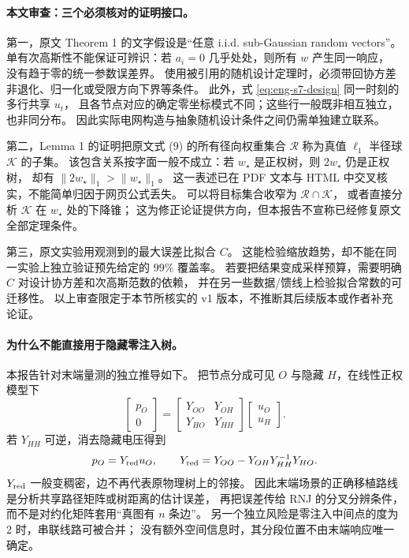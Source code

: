 \paragraph{本文审查：三个必须核对的证明接口。}
第一，原文 Theorem 1 的文字假设是“任意 i.i.d. sub-Gaussian random vectors”。
单有次高斯性不能保证可辨识：若 $a_i=0$ 几乎处处，则所有 $w$ 产生同一响应，
没有趋于零的统一参数误差界。
使用被引用的随机设计定理时，必须带回协方差非退化、归一化或受限方向下界等条件。
此外，式 \eqref{eq:eng-s7-design} 同一时刻的多行共享 $u_t$，
且各节点对应的确定零坐标模式不同；这些行一般既非相互独立，也非同分布。
因此实际电网构造与抽象随机设计条件之间仍需单独建立联系。

第二，Lemma 1 的证明把原文式 (9) 的所有径向权重集合 $\mathcal R$
称为真值 $\ell_1$ 半径球 $\mathcal K$ 的子集。
该包含关系按字面一般不成立：若 $w_\star$ 是正权树，则 $2w_\star$ 仍是正权树，
却有 $\|2w_\star\|_1>\|w_\star\|_1$。
这一表述已在 PDF 文本与 HTML 中交叉核实，不能简单归因于网页公式丢失。
可以将目标集合收窄为 $\mathcal R\cap\mathcal K$，
或者直接分析 $\mathcal K$ 在 $w_\star$ 处的下降锥；
这为修正论证提供方向，但本报告不宣称已经修复原文全部定理条件。

第三，原文实验用观测到的最大误差比拟合 $C$。
这能检验缩放趋势，却不能在同一实验上独立验证预先给定的 $99\%$ 覆盖率。
若要把结果变成采样预算，需要明确 $C$ 对设计协方差和次高斯范数的依赖，
并在另一些数据/馈线上检验拟合常数的可迁移性。
以上审查限定于本节所核实的 v1 版本，不推断其后续版本或作者补充论证。

\paragraph{为什么不能直接用于隐藏零注入树。}
本报告针对末端量测的独立推导如下。
把节点分成可见 $O$ 与隐藏 $H$，在线性正权模型下
\begin{equation}
 \begin{bmatrix}p_O\\0\end{bmatrix}
 =\begin{bmatrix}Y_{OO}&Y_{OH}\\Y_{HO}&Y_{HH}\end{bmatrix}
 \begin{bmatrix}u_O\\u_H\end{bmatrix}.
 \label{eq:eng-s7-kron-start}
\end{equation}
若 $Y_{HH}$ 可逆，消去隐藏电压得到
\begin{equation}
 p_O=Y_{\rm red}u_O,\qquad
 Y_{\rm red}=Y_{OO}-Y_{OH}Y_{HH}^{-1}Y_{HO}.
 \label{eq:eng-s7-kron}
\end{equation}
$Y_{\rm red}$ 一般变稠密，边不再代表原物理树上的邻接。
因此末端场景的正确移植路线是分析共享路径矩阵或树距离的估计误差，
再把误差传给 RNJ 的分叉分辨条件，而不是对约化矩阵套用“真图有 $n$ 条边”。
另一个独立风险是零注入中间点的度为 2 时，串联线路可被合并；
没有额外空间信息时，其分段位置不由末端响应唯一确定。

